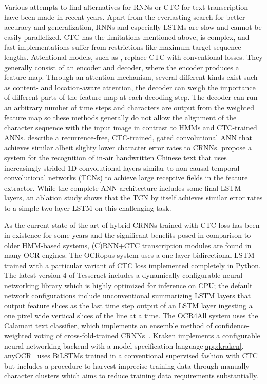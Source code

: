 Various attempts to find alternatives for RNNs or CTC for text transcription
have been made in recent years. Apart from the everlasting search for better
accuracy and generalization, RNNs and especially LSTMs are slow and cannot be
easily parallelized. CTC has the limitations mentioned above, is complex, and
fast implementations suffer from restrictions like maximum target sequence
lengths. Attentional models, such as
\cite{sueiras2018offline,michael2019evaluating,kang2018convolve}, replace CTC
with conventional losses. They generally consist of an encoder and decoder,
where the encoder produces a feature map.  Through an attention mechanism,
several different kinds exist such as content- and location-aware attention,
the decoder can weigh the importance of different parts of the feature map at
each decoding step. The decoder can run an arbitrary number of time steps and
characters are output from the weighted feature map so these methods generally
do not allow the alignment of the character sequence with the input image in
contrast to HMMs and CTC-trained ANNs. \cite{coquenet2020recurrence} describe a
recurrence-free, CTC-trained, gated convolutional ANN that achieves similar
albeit slighty lower character error rates to CRNNs. \cite{gan2020air} propose
a system for the recognition of in-air handwritten Chinese text that uses
increasingly strided 1D convolutional layers similar to non-causal temporal
convolutional networks (TCNs) to achieve large receptive fields in the feature
extractor. While the complete ANN architecture includes some final LSTM layers,
an ablation study shows that the TCN by itself achieves similar error rates to
a simple two layer LSTM on this challenging task.

As the current state of the art of hybrid CRNNs trained with CTC loss has been
in existence for some years and the significant benefits posed in comparison to
older HMM-based systems, (C)RNN+CTC transcription modules are found in many OCR
engines. The OCRopus system uses a one layer bidirectional LSTM trained with a
particular variant of CTC loss implemented completely in Python. The latest
version 4 of Tesseract includes a dynamically configurable neural networking
library which is highly optimized for inference on CPU; the default network
configurations include unconventional summarizing LSTM layers that output
feature slices as the last time step output of an LSTM layer ingesting a one
pixel wide vertical slices of the line at a time. The OCR4All system uses the
Calamari text classifier, which implements an ensemble method of
confidence-weighted voting of cross-fold-trained CRNNs~\cite{wick2018calamari}.
Kraken implements a configurable neural networking backend with a model
specification language\ref{app:kraken}.  anyOCR~\cite{bukhari2017anyocr} uses
BiLSTMs trained in a conventional supervised fashion with CTC but includes a
procedure to harvest imprecise training data through manually character
clusters which aims to reduce training data requirements substantially.

